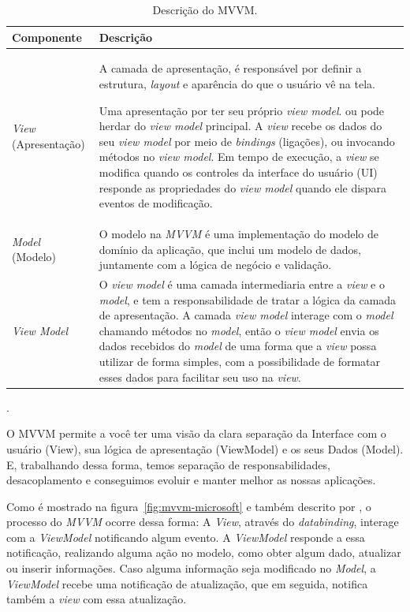 \begin{table}[htdp]
    \begin{center}
        \begin{tabular}{|l|p{11cm}|}
            \hline \textbf{Componente} & \textbf{Descrição} \\
            \hline \textit{View} (Apresentação) & 
            A camada de apresentação, é responsável por definir a estrutura, \textit{layout} e aparência do que o usuário vê na tela.
            
            Uma apresentação por ter seu próprio \textit{view model}. ou pode herdar do \textit{view model} principal. A \textit{view} recebe os dados do seu \textit{view model} por meio de \textit{bindings} (ligações), ou invocando métodos no \textit{view model}. Em tempo de execução, a \textit{view} se modifica quando os controles da interface do usuário (UI) responde  as propriedades do \textit{view model} quando ele dispara eventos de modificação.
             \\
            \hline \textit{Model} (Modelo) & 
            O modelo na \textit{MVVM} é uma implementação do modelo de domínio da aplicação, que inclui um modelo de dados, juntamente com a lógica de negócio e validação. \\
            \hline \textit{View Model} & 
            O \textit{view model} é uma camada intermediaria entre a \textit{view} e o \textit{model}, e tem a responsabilidade de tratar a lógica da camada de apresentação. A camada \textit{view model} interage com o \textit{model} chamando métodos no \textit{model}, então o \textit{view model} envia os dados recebidos do \textit{model} de uma forma que a \textit{view} possa utilizar de forma simples, com a possibilidade de formatar esses dados para facilitar seu uso na \textit{view}. \\
            \hline
        \end{tabular}
        \caption{Descrição do \ac{MVVM}.}.
        \label{tbl:mvvm}
    \end{center}
\end{table}

\begin{citacao}
    O MVVM permite a você ter uma visão da clara separação da Interface com o usuário (View), sua lógica de apresentação (ViewModel) e os seus Dados (Model). E, trabalhando dessa forma, temos separação de responsabilidades, desacoplamento e conseguimos evoluir e manter melhor as nossas aplicações. \cite{ferreira_mvvm}
\end{citacao}

Como é mostrado na figura~\ref{fig:mvvm-microsoft} e também descrito por , o processo do \textit{MVVM} ocorre dessa forma: A \textit{View}, através do \textit{databinding}, interage com a \textit{ViewModel} notificando algum evento. A \textit{ViewModel} responde a essa notificação, realizando alguma ação no modelo, como obter algum dado, atualizar ou inserir informações. Caso alguma informação seja modificado no \textit{Model}, a \textit{ViewModel} recebe uma notificação de atualização, que em seguida, notifica também a \textit{view} com essa atualização.
